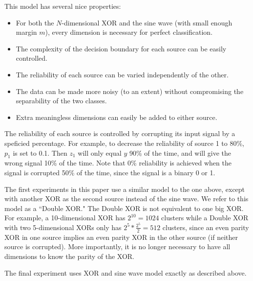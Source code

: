 \documentclass{article}
\begin{document}
\begin{minipage}{\textwidth}
\begin{minipage}{.48\textwidth}
    \label{fig:sine_wave}
\end{minipage}
\end{minipage}

This model has several nice properties:
\begin{itemize}
    \item For both the $N$-dimensional XOR and the sine wave (with small enough
        margin $m$), every dimension is necessary for perfect classification.
    \item The complexity of the decision boundary for each source can be easily
        controlled.
    \item The reliability of each source can be varied independently of the
        other.
    \item The data can be made more noisy (to an extent) without
        compromising the separability of the two classes.
    \item Extra meaningless dimensions can easily be added to either source.
\end{itemize}

The reliability of each source is controlled by corrupting its input signal by
a speficied percentage. For example, to decrease the reliability of source 1 to
80\%, $p_1$ is set to 0.1. Then $z_1$ will only equal $y$ 90\% of the time, and
will give the wrong signal 10\% of the time. Note that 0\% reliability is
achieved when the signal is corrupted 50\% of the time, since the signal is a
binary 0 or 1.

The first experiments in this paper use a similar model to the one above,
except with another XOR as the second source instead of the sine wave. We refer
to this model as a ``Double XOR." The Double XOR is not equivalent to one big
XOR. For example, a 10-dimensional XOR has $2^{10}=1024$ clusters while a Double
XOR with two 5-dimensional XORs only has $2^5 * \frac{2^5}{2} = 512$ clusters,
since an even parity XOR in one source implies an even parity XOR in the other
source (if neither source is corrupted). More importantly, it is no longer
necessary to have all dimensions to know the parity of the XOR.

The final experiment uses XOR and sine wave model exactly as described above.
\end{document}
